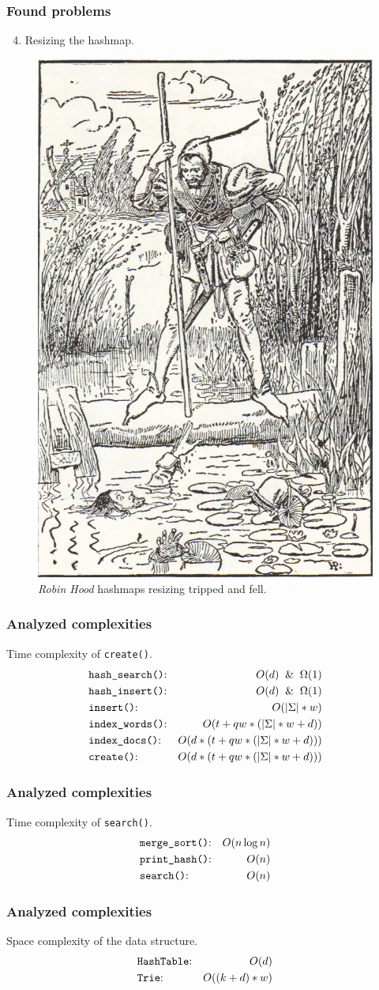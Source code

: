 \documentclass{beamer}
\begin{document}
\begin{frame}
  \frametitle{Found problems}
  \begin{enumerate}
    \setcounter{enumi}{3}
    \item Resizing the hashmap.
  \end{enumerate}
  \begin{figure}
    \includegraphics[width=0.3\linewidth]{Robin-hood-at-the-lake-01.png}
    \caption{\textit{Robin Hood} hashmaps resizing tripped and fell.}
    \label{fig:robinhood2}
  \end{figure}
\end{frame}

\begin{frame}
  \frametitle{Analyzed complexities}
  Time complexity of \texttt{create()}.
  \begin{align*}
     & \text{\texttt{hash\_search()}:} & O(d) \And \Omega(1)                                       \\
     & \text{\texttt{hash\_insert()}:} & O(d) \And \Omega(1)                                       \\
     & \text{\texttt{insert()}:}       & O(\left\vert \Sigma \right\vert * w)                      \\
     & \text{\texttt{index\_words()}:} & O(t + qw * (\left\vert \Sigma \right\vert * w + d))       \\
     & \text{\texttt{index\_docs()}:}  & O(d * (t + qw * (\left\vert \Sigma \right\vert * w + d))) \\
     & \text{\texttt{create()}:}       & O(d * (t + qw * (\left\vert \Sigma \right\vert * w + d)))
  \end{align*}
\end{frame}

\begin{frame}
  \frametitle{Analyzed complexities}
  Time complexity of \texttt{search()}.
  \begin{align*}
     & \text{\texttt{merge\_sort()}:} & O(n \log{n}) \\
     & \text{\texttt{print\_hash()}:} & O(n)         \\
     & \text{\texttt{search()}:}      & O(n)
  \end{align*}
\end{frame}

\begin{frame}
  \frametitle{Analyzed complexities}
  Space complexity of the data structure.
  \begin{align*}
     & \text{\texttt{HashTable}:} & O(d)           \\
     & \text{\texttt{Trie}:}      & O((k + d) * w)
  \end{align*}
\end{frame}
\end{document}
